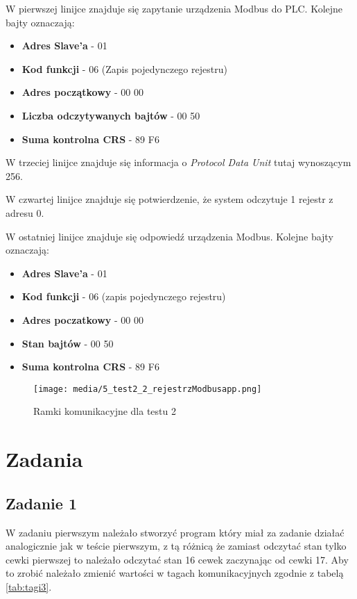 \documentclass{article}
\begin{document}
W pierwszej linijce znajduje się zapytanie urządzenia Modbus do PLC. Kolejne bajty oznaczają:
\begin{itemize}
    \item \textbf{Adres Slave'a} - 01
    \item \textbf{Kod funkcji} - 06 (Zapis pojedynczego rejestru)
    \item \textbf{Adres początkowy} - 00 00
    \item \textbf{Liczba odczytywanych bajtów} - 00 50
    \item \textbf{Suma kontrolna CRS} - 89 F6
\end{itemize}


W trzeciej linijce znajduje się informacja o \textit{Protocol Data Unit} tutaj wynoszącym 256.

W czwartej linijce znajduje się potwierdzenie, że system odczytuje 1 rejestr z adresu 0.

W ostatniej linijce znajduje się odpowiedź urządzenia Modbus. Kolejne bajty oznaczają:
\begin{itemize}
    \item \textbf{Adres Slave'a} - 01
    \item \textbf{Kod funkcji} - 06 (zapis pojedynczego rejestru)
    \item \textbf{Adres poczatkowy} - 00 00 
    \item \textbf{Stan bajtów} - 00 50
    \item \textbf{Suma kontrolna CRS} - 89 F6
\end{itemize}


\begin{figure}[H]
    \centering
    \texttt{[image: media/5\_test2\_2\_rejestrzModbusapp.png]}
    \caption{Ramki komunikacyjne dla testu 2}
    \label{fig:zdj15}
\end{figure}

\newpage
\section{Zadania}
\subsection{Zadanie 1}
W zadaniu pierwszym należało stworzyć program który miał za zadanie działać analogicznie jak w teście pierwszym, z tą różnicą że zamiast odczytać stan tylko cewki pierwszej to należało odczytać stan 16 cewek zaczynając od cewki 17. Aby to zrobić należało zmienić wartości w tagach komunikacyjnych zgodnie z tabelą \ref{tab:tagi3}.
\end{document}
